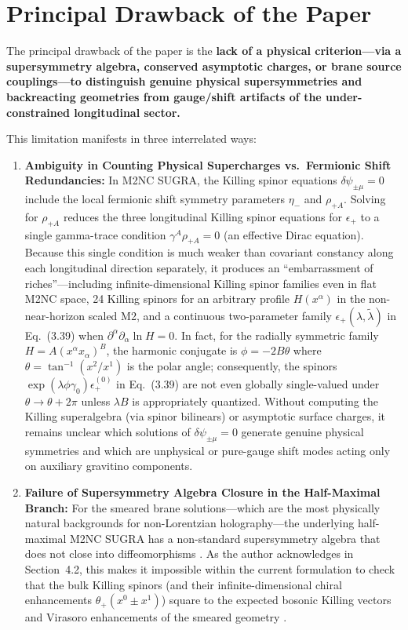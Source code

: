 \documentclass[11pt]{article}
\begin{document}
\section{Principal Drawback of the Paper}
The principal drawback of the paper is the \textbf{lack of a physical criterion---via a supersymmetry algebra, conserved asymptotic charges, or brane source couplings---to distinguish genuine physical supersymmetries and backreacting geometries from gauge/shift artifacts of the under-constrained longitudinal sector.}

This limitation manifests in three interrelated ways:
\begin{enumerate}
    \item \textbf{Ambiguity in Counting Physical Supercharges vs.\ Fermionic Shift Redundancies:} In M2NC SUGRA, the Killing spinor equations $\delta\psi_{\pm\mu} = 0$ include the local fermionic shift symmetry parameters $\eta_-$ and $\rho_{+A}$. Solving for $\rho_{+A}$ reduces the three longitudinal Killing spinor equations for $\epsilon_+$ to a single gamma-trace condition $\gamma^A \rho_{+A} = 0$ (an effective Dirac equation). Because this single condition is much weaker than covariant constancy along each longitudinal direction separately, it produces an ``embarrassment of riches''---including infinite-dimensional Killing spinor families even in flat M2NC space, 24 Killing spinors for an arbitrary profile $H(x^\alpha)$ in the non-near-horizon scaled M2, and a continuous two-parameter family $\epsilon_+(\lambda,\tilde\lambda)$ in Eq.~(3.39) when $\partial^\alpha\partial_\alpha \ln H = 0$. In fact, for the radially symmetric family $H = A(x^\alpha x_\alpha)^B$, the harmonic conjugate is $\phi = -2B\theta$ where $\theta = \tan^{-1}(x^2/x^1)$ is the polar angle; consequently, the spinors $\exp(\lambda\phi\gamma_0)\epsilon_+^{(0)}$ in Eq.~(3.39) are not even globally single-valued under $\theta \to \theta + 2\pi$ unless $\lambda B$ is appropriately quantized. Without computing the Killing superalgebra (via spinor bilinears) or asymptotic surface charges, it remains unclear which solutions of $\delta\psi_{\pm\mu} = 0$ generate genuine physical symmetries and which are unphysical or pure-gauge shift modes acting only on auxiliary gravitino components.

    \item \textbf{Failure of Supersymmetry Algebra Closure in the Half-Maximal Branch:} For the smeared brane solutions---which are the most physically natural backgrounds for non-Lorentzian holography---the underlying half-maximal M2NC SUGRA has a non-standard supersymmetry algebra that does not close into diffeomorphisms \cite{Bergshoeff:2024nin}. As the author acknowledges in Section~4.2, this makes it impossible within the current formulation to check that the bulk Killing spinors (and their infinite-dimensional chiral enhancements $\theta_+(x^0\pm x^1)$) square to the expected bosonic Killing vectors and Virasoro enhancements of the smeared geometry \cite{Lambert:2024ncn}.


\end{enumerate}
\end{document}
